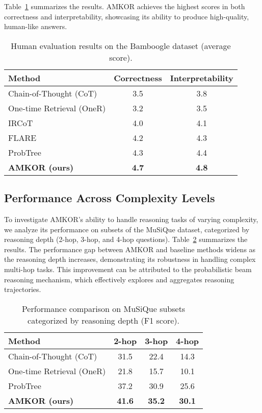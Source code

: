 Table~\ref{tab:human_eval} summarizes the results. AMKOR achieves the highest scores in both correctness and interpretability, showcasing its ability to produce high-quality, human-like answers.

\begin{table}[ht]
\centering
\caption{Human evaluation results on the Bamboogle dataset (average score).}
\label{tab:human_eval}
\begin{tabular}{lcc}
\toprule
\textbf{Method} & \textbf{Correctness} & \textbf{Interpretability} \\
\midrule
Chain-of-Thought (CoT) & 3.5 & 3.8 \\
One-time Retrieval (OneR) & 3.2 & 3.5 \\
IRCoT & 4.0 & 4.1 \\
FLARE & 4.2 & 4.3 \\
ProbTree & 4.3 & 4.4 \\
\textbf{AMKOR (ours)} & \textbf{4.7} & \textbf{4.8} \\
\bottomrule
\end{tabular}
\end{table}



\subsection{Performance Across Complexity Levels}

To investigate AMKOR's ability to handle reasoning tasks of varying complexity, we analyze its performance on subsets of the MuSiQue dataset, categorized by reasoning depth (2-hop, 3-hop, and 4-hop questions). Table~\ref{tab:complexity_analysis} summarizes the results. The performance gap between AMKOR and baseline methods widens as the reasoning depth increases, demonstrating its robustness in handling complex multi-hop tasks. This improvement can be attributed to the probabilistic beam reasoning mechanism, which effectively explores and aggregates reasoning trajectories.

\begin{table}[ht]
\centering
\caption{Performance comparison on MuSiQue subsets categorized by reasoning depth (F1 score).}
\label{tab:complexity_analysis}
\begin{tabular}{lccc}
\toprule
\textbf{Method} & \textbf{2-hop} & \textbf{3-hop} & \textbf{4-hop} \\
\midrule
Chain-of-Thought (CoT) & 31.5 & 22.4 & 14.3 \\
One-time Retrieval (OneR) & 21.8 & 15.7 & 10.1 \\
ProbTree & 37.2 & 30.9 & 25.6 \\
\textbf{AMKOR (ours)} & \textbf{41.6} & \textbf{35.2} & \textbf{30.1} \\
\bottomrule
\end{tabular}
\end{table}

